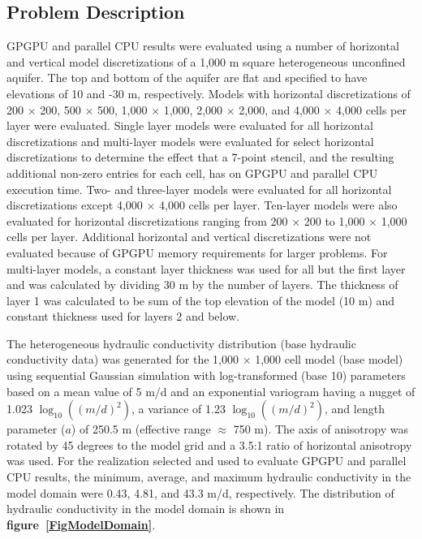 \documentclass[12pt]{article}
\begin{document}
\subsection*{Problem Description}
GPGPU and parallel CPU results were evaluated using a number of horizontal and vertical model discretizations of a 1,000 m square heterogeneous unconfined aquifer.  The top and bottom of the aquifer are flat and specified to have elevations of 10 and -30 m, respectively. Models with horizontal discretizations of 200 $\times$ 200, 500 $\times$ 500, 1,000 $\times$ 1,000, 2,000 $\times$ 2,000, and 4,000 $\times$ 4,000 cells per layer were evaluated. Single layer models were evaluated for all horizontal discretizations and multi-layer models were evaluated for select horizontal discretizations to determine the effect that a 7-point stencil, and the resulting additional non-zero entries for each cell, has on GPGPU and parallel CPU execution time. Two- and three-layer models were evaluated for all horizontal discretizations except 4,000 $\times$ 4,000 cells per layer. Ten-layer models were also evaluated for horizontal discretizations ranging from 200 $\times$ 200 to 1,000 $\times$ 1,000 cells per layer. Additional horizontal and vertical discretizations were not evaluated because of GPGPU memory requirements for larger problems. For multi-layer models, a constant layer thickness was used for all but the first layer and was calculated by dividing 30 m by the number of layers. The thickness of layer 1 was calculated to be sum of the top elevation of the model (10 m) and constant thickness used for layers 2 and below.

The heterogeneous hydraulic conductivity distribution (base hydraulic conductivity data) was generated for the 1,000 $\times$ 1,000 cell model (base model) using sequential Gaussian simulation with log-transformed (base 10) parameters based on a mean value of 5 m/d and an exponential variogram having a nugget of 1.023 $\log_{10}((m/d)^{2})$, a variance of 1.23 $\log_{10}((m/d)^{2})$, and length parameter ($a$) of 250.5 m (effective range $\approx$ 750 m). The axis of anisotropy was rotated by 45 degrees to the model grid and a 3.5:1 ratio of horizontal anisotropy was used. For the realization selected and used to evaluate GPGPU and parallel CPU results, the minimum, average, and maximum hydraulic conductivity in the model domain were 0.43, 4.81, and 43.3 m/d, respectively. The distribution of hydraulic conductivity in the model domain is shown in \textbf{figure~\ref{FigModelDomain}}.
\end{document}
